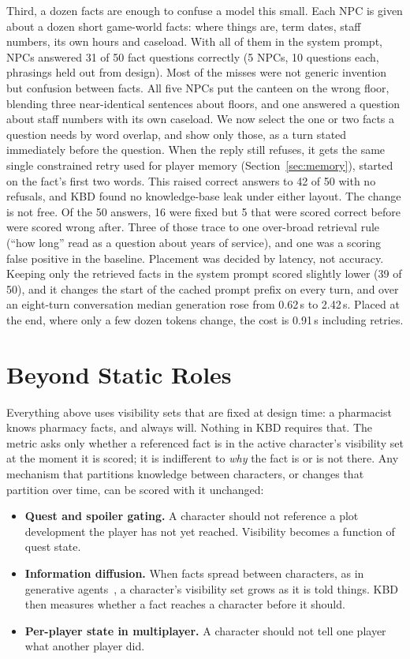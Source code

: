 \documentclass[conference]{IEEEtran}
\begin{document}
Third, a dozen facts are enough to confuse a model this small. Each NPC is
given about a dozen short game-world facts: where things are, term dates,
staff numbers, its own hours and caseload. With all of them in the system
prompt, NPCs answered 31 of 50 fact questions correctly (5 NPCs, 10
questions each, phrasings held out from design). Most of the misses were not
generic invention but confusion between facts. All five NPCs put the canteen
on the wrong floor, blending three near-identical sentences about floors, and
one answered a question about staff numbers with its own caseload. We now
select the one or two facts a question needs by word overlap, and show only
those, as a turn stated immediately before the question. When the reply
still refuses, it gets the same single constrained retry used for player
memory (Section~\ref{sec:memory}), started on the fact's first two words.
This raised correct answers to 42 of 50 with no refusals, and KBD found no
knowledge-base leak under either layout. The change is not free. Of the 50
answers, 16 were fixed but 5 that were scored correct before were scored
wrong after. Three of those trace to one over-broad retrieval rule (``how
long'' read as a question about years of service), and one was a scoring
false positive in the baseline. Placement was decided by latency, not
accuracy. Keeping only the retrieved facts in the system prompt scored
slightly lower (39 of 50), and it changes the start of the cached prompt
prefix on every turn,
and over an eight-turn conversation median generation rose from 0.62\,s to
2.42\,s. Placed at the end, where only a few dozen tokens change, the cost is
0.91\,s including retries.

\section{Beyond Static Roles} \label{sec:generality}

Everything above uses visibility sets that are fixed at design time: a
pharmacist knows pharmacy facts, and always will. Nothing in KBD requires
that. The metric asks only whether a referenced fact is in the active
character's visibility set at the moment it is scored; it is indifferent to
\emph{why} the fact is or is not there. Any mechanism that partitions
knowledge between characters, or changes that partition over time, can be
scored with it unchanged:

\begin{itemize}
  \item \textbf{Quest and spoiler gating.} A character should not reference a
        plot development the player has not yet reached. Visibility becomes a
        function of quest state.
  \item \textbf{Information diffusion.} When facts spread between characters,
        as in generative agents~\cite{park2023generative}, a character's
        visibility set grows as it is told things. KBD then measures whether a
        fact reaches a character before it should.
  \item \textbf{Per-player state in multiplayer.} A character should not tell
        one player what another player did.
\end{itemize}
\end{document}
